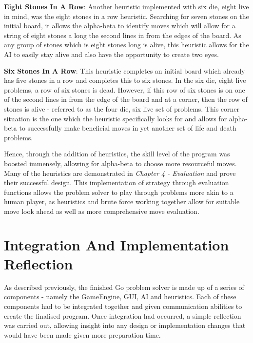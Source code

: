 \documentclass{l3proj}
\begin{document}
\textbf{Eight Stones In A Row}: Another heuristic implemented with six die, eight live in mind, was the eight stones in a row heuristic. Searching for seven stones on the initial board, it allows the alpha-beta to identify moves which will allow for a string of eight stones a long the second lines in from the edges of the board. As any group of stones which is eight stones long is alive, this heuristic allows for the AI to easily stay alive and also have the opportunity to create two eyes.

\textbf{Six Stones In A Row}: This heuristic completes an initial board which already has five stones in a row and completes this to six stones. In the six die, eight live problems, a row of six stones is dead. However, if this row of six stones is on one of the second lines in from the edge of the board and at a corner, then the row of stones is alive - referred to as the four die, six live set of problems. This corner situation is the one which the heuristic specifically looks for and allows for alpha-beta to successfully make beneficial moves in yet another set of life and death problems.

Hence, through the addition of heuristics, the skill level of the program was boosted immensely, allowing for alpha-beta to choose more resourceful moves. Many of the heuristics are demonstrated in \textit{Chapter 4 - Evaluation} and prove their successful design. This implementation of strategy through evaluation functions allows the problem solver to play through problems more akin to a human player, as heuristics and brute force working together allow for suitable move look ahead as well as more comprehensive move evaluation.

\section{Integration And Implementation Reflection}

As described previously, the finished Go problem solver is made up of a series of components - namely the GameEngine, GUI, AI and heuristics. Each of these components had to be integrated together and given communication abilities to create the finalised program. Once integration had occurred, a simple reflection was carried out, allowing insight into any design or implementation changes that would have been made given more preparation time.
\end{document}
